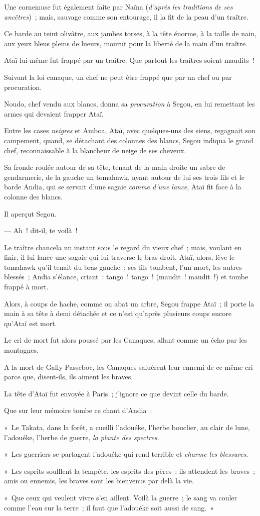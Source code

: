 \documentclass[french,twoside]{book} %
\newcommand\chapterclose{} %
\begin{document}
Une cornemuse fut également faite par Naïna (\emph{d’après les traditions de ses ancêtres}) ; mais, sauvage comme son entourage, il la fit de la peau d’un traître.\par
Ce barde au teint olivâtre, aux jambes torses,  à la tête énorme, à la taille de nain, aux yeux bleus pleins de lueurs, mourut pour la liberté de la main d’un traître.\par
Ataï lui-même fut frappé par un traître. Que partout les traîtres soient maudits !\par
Suivant la loi canaque, un chef ne peut être frappé que par un chef ou par procuration.\par
Noudo, chef vendu aux blancs, donna sa \emph{procuration} à Segou, en lui remettant les armes qui devaient frapper Ataï.\par
Entre les cases \emph{neigres} et Amboa, Ataï, avec quelques-uns des siens, regagnait son campement, quand, se détachant des colonnes des blancs, Segou indiqua le grand chef, reconnaissable à la blancheur de neige de ses cheveux.\par
Sa fronde roulée autour de sa tête, tenant de la main droite un sabre de gendarmerie, de la gauche un tomahawk, ayant autour de lui ses trois fils et le barde Andia, qui se servait d’une sagaie \emph{comme d’une lance}, Ataï fit face à la colonne des blancs.\par
Il aperçut Segou.\par
— Ah ! dit-il, te voilà !\par
Le traître chancela un instant sous le regard du vieux chef ; mais, voulant en finir, il lui lance une sagaie qui lui traverse le bras droit. Ataï, alors, lève le tomahawk qu’il tenait du bras gauche ;  ses fils tombent, l’un mort, les autres blessés ; Andia s’élance, criant : tango ! tango ! (maudit ! maudit !) et tombe frappé à mort.\par
Alors, à coups de hache, comme on abat un arbre, Segou frappe Ataï ; il porte la main à sa tête à demi détachée et ce n’est qu’après plusieurs coups encore qu’Ataï est mort.\par
Le cri de mort fut alors poussé par les Canaques, allant comme un écho par les montagnes.\par
A la mort de Gally Passeboc, les Canaques saluèrent leur ennemi de ce même cri parce que, disent-ils, ils aiment les braves.\par
La tête d’Ataï fut envoyée à Paris ; j’ignore ce que devint celle du barde.\par
Que sur leur mémoire tombe ce chant d’Andia :\par
« Le Takata, dans la forêt, a cueilli l’adouéke, l’herbe bouclier, au clair de lune, l’adouéke, l’herbe de guerre, \emph{la plante des spectres.}\par
« Les guerriers se partagent l’adouéke qui rend terrible et \emph{charme les blessures}.\par
« Les esprits soufflent la tempête, les esprits des pères ; ils attendent les braves ; amis ou ennemis, les braves sont les bienvenus par delà la vie.\par
« Que ceux qui veulent vivre s’en aillent. Voilà la guerre ; le sang va couler comme l’eau sur la terre ; il faut que l’adouéke soit aussi de sang. »
\chapterclose
\end{document}
